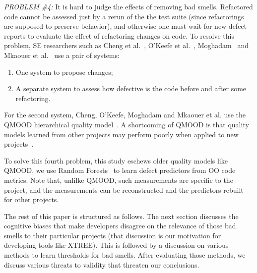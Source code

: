 \documentclass{sig-alternate}
\theoremstyle{break}
\begin{document}
 
{\em PROBLEM \#4:} It is hard to judge the  effects of removing bad smells.
Refactored code cannot be assessed just by a rerun of the the test
suite (since refactorings are supposed to preserve behavior), and otherwise one must wait for new defect reports to evaluate the effect of refactoring changes on code.  
To resolve this  problem, SE researchers such as 
Cheng et al.~\cite{Cheng10}, O'Keefe et al.~\cite{OKeeffe08,OKeeffe07},
Moghadam~\cite{Moghadam2011} and Mkaouer et al.~\cite{Mkaouer14}
use a pair of systems: 
\begin{enumerate}
    \item One system to propose changes;
\item A separate system to assess
how defective is the code before and after some
refactoring.
\end{enumerate}
For the second system,
 Cheng, O'Keefe, Moghadam and  Mkaouer et al. use the QMOOD hierarchical
quality model~\cite{Bansiya02}.
A shortcoming of QMOOD
is that quality models learned from other projects
may perform poorly when applied to new projects~\cite{localvsglobal}.


To solve this fourth problem, this study  eschews
older quality models like QMOOD, we use
Random Forests~\cite{Breiman2001} to learn defect predictors
from OO code metrics.
Note that, unlilke QMOOD, such measurements 
  are specific to the project, and the measurements can be reconstructed and the predictors rebuilt for other projects.
  
 
 
The rest of this paper is structured as follows. 
The next section
discusses the cognitive
biases that make developers disagree on the relevance of those bad smells to
their particular projects
(that discussion is our motivation for developing 
tools like XTREE). This is followed by a discussion
on various methods to learn thresholds for bad smells.
After evaluating those methods, we discuss various threats to
validity that threaten our conclusions.
\end{document}

